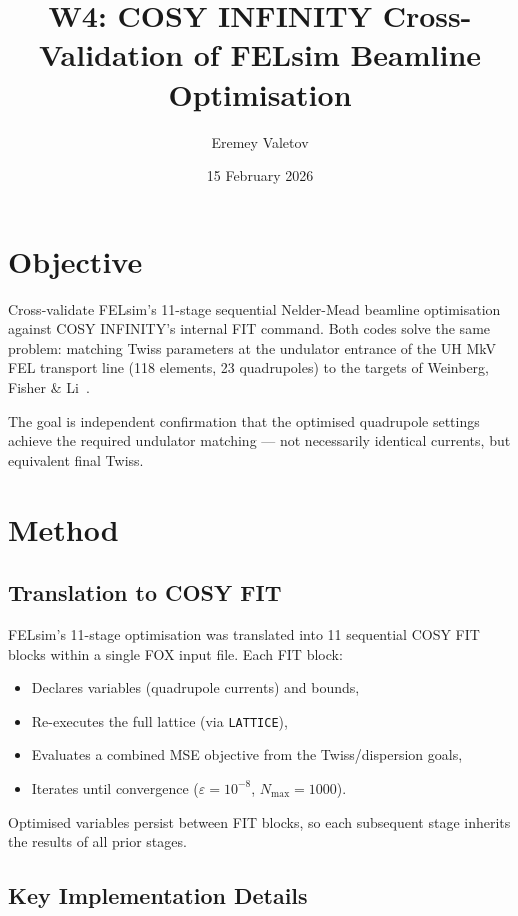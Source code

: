 \documentclass[11pt]{article}
\title{W4: COSY INFINITY Cross-Validation of FELsim Beamline Optimisation}
\author{Eremey Valetov}
\date{15 February 2026}
\begin{document}
\maketitle

\section{Objective}

Cross-validate FELsim's 11-stage sequential Nelder-Mead beamline optimisation
against COSY INFINITY's internal FIT command. Both codes solve the same problem:
matching Twiss parameters at the undulator entrance of the UH MkV FEL transport
line (118 elements, 23 quadrupoles) to the targets of
Weinberg, Fisher \& Li~\cite{weinberg2025}.

The goal is independent confirmation that the optimised quadrupole settings
achieve the required undulator matching --- not necessarily identical currents,
but equivalent final Twiss.


\section{Method}

\subsection{Translation to COSY FIT}

FELsim's 11-stage optimisation was translated into 11 sequential COSY FIT
blocks within a single FOX input file. Each FIT block:
\begin{itemize}
  \item Declares variables (quadrupole currents) and bounds,
  \item Re-executes the full lattice (via \texttt{LATTICE}),
  \item Evaluates a combined MSE objective from the Twiss/dispersion goals,
  \item Iterates until convergence ($\varepsilon = 10^{-8}$, $N_\mathrm{max} = 1000$).
\end{itemize}

Optimised variables persist between FIT blocks, so each subsequent stage
inherits the results of all prior stages.

\subsection{Key Implementation Details}
\end{document}
